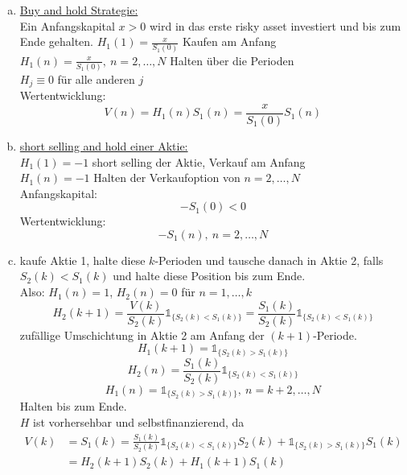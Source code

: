 \begin{enumerate}[(a)]
	\item \uline{Buy and hold Strategie:}\\
	Ein Anfangskapital $x>0$ wird in das erste risky asset investiert und bis zum Ende gehalten.
	$H_1(1)=\frac{x}{S_1(0)}$ Kaufen am Anfang\\
	$H_1(n)=\frac{x}{S_1(0)},~n=2,\dots,N$ Halten über die Perioden\\
	$H_j\equiv 0$ für alle anderen $j$\\
	Wertentwicklung:\\
	\[
	V(n)=H_1(n)S_1(n)=\frac{x}{S_1(0)}S_1(n)
	\]
	\item \uline{short selling and hold einer Aktie:}\\
	$H_1(1)=-1$ short selling der Aktie, Verkauf am Anfang\\
	$H_1(n)=-1$ Halten der Verkaufoption von $n=2,\dots,N$\\
	Anfangskapital:
	\[
	-S_1(0)<0
	\]
	Wertentwicklung:
	\[
	-S_1(n),~n=2,\dots,N
	\]
	\newpage
	\item kaufe Aktie 1, halte diese $k$-Perioden und tausche danach in Aktie 2, falls $S_2(k)<S_1(k)$ und halte diese Position bis zum Ende.\\
	Also:
	$H_1(n)=1$, $H_2(n)=0$ für $n=1,\dots,k$\\
	\[
	H_2(k+1)=\frac{V(k)}{S_2(k)}\mathbb{1}_{\{S_2(k)<S_1(k)\}}=\frac{S_1(k)}{S_2(k)}\mathbb{1}_{\{S_2(k)<S_1(k)\}}
	\] 
	zufällige Umschichtung in Aktie 2 am Anfang der $(k+1)$-Periode.\\
	\[
	H_1(k+1)=\mathbb{1}_{\{S_2(k)>S_1(k)\}}
	\]
	\[
	H_2(n)=\frac{S_1(k)}{S_2(k)}\mathbb{1}_{\{S_2(k)<S_1(k)\}}
	\]
	\[
	H_1(n)=\mathbb{1}_{\{S_2(k)>S_1(k)\}},~ n=k+2,\dots,N
	\]
	Halten bis zum Ende.\\
	$H$ ist vorhersehbar und selbstfinanzierend, da 
	\begin{equation*}
	\begin{aligned}
		V(k) &= S_1(k)=\frac{S_1(k)}{S_2(k)}\mathbb{1}_{\{S_2(k)<S_1(k)\}}S_2(k)+\mathbb{1}_{\{S_2(k)>S_1(k)\}}S_1(k)\\
		&= H_2(k+1)S_2(k)+H_1(k+1)S_1(k)
	\end{aligned}
	\end{equation*}
\end{enumerate}

